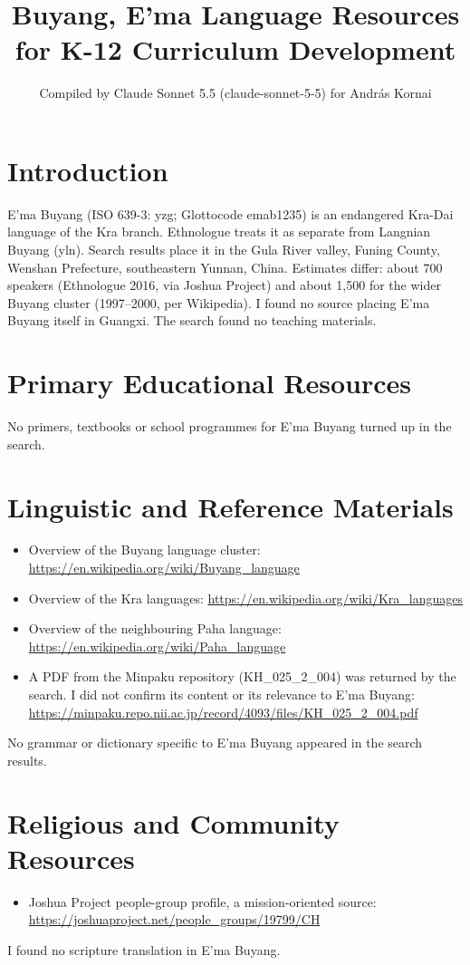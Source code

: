 \documentclass[12pt]{article}
\title{Buyang, E'ma Language Resources for K-12 Curriculum Development}
\author{Compiled by Claude Sonnet 5.5 (claude-sonnet-5-5) for Andr\'as Kornai}
\date{}
\begin{document}
\maketitle

\section{Introduction}
E'ma Buyang (ISO 639-3: yzg; Glottocode emab1235) is an endangered Kra-Dai language of the Kra branch. Ethnologue treats it as separate from Langnian Buyang (yln). Search results place it in the Gula River valley, Funing County, Wenshan Prefecture, southeastern Yunnan, China. Estimates differ: about 700 speakers (Ethnologue 2016, via Joshua Project) and about 1,500 for the wider Buyang cluster (1997--2000, per Wikipedia). I found no source placing E'ma Buyang itself in Guangxi. The search found no teaching materials.

\section{Primary Educational Resources}
No primers, textbooks or school programmes for E'ma Buyang turned up in the search.

\section{Linguistic and Reference Materials}
\begin{itemize}
\item Overview of the Buyang language cluster: \url{https://en.wikipedia.org/wiki/Buyang_language}
\item Overview of the Kra languages: \url{https://en.wikipedia.org/wiki/Kra_languages}
\item Overview of the neighbouring Paha language: \url{https://en.wikipedia.org/wiki/Paha_language}
\item A PDF from the Minpaku repository (KH\_025\_2\_004) was returned by the search. I did not confirm its content or its relevance to E'ma Buyang: \url{https://minpaku.repo.nii.ac.jp/record/4093/files/KH_025_2_004.pdf}
\end{itemize}
No grammar or dictionary specific to E'ma Buyang appeared in the search results.

\section{Religious and Community Resources}
\begin{itemize}
\item Joshua Project people-group profile, a mission-oriented source: \url{https://joshuaproject.net/people_groups/19799/CH}
\end{itemize}
I found no scripture translation in E'ma Buyang.
\end{document}
